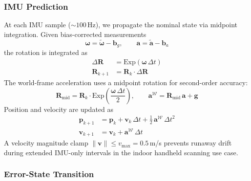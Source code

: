 \subsubsection{IMU Prediction}
\label{sec:imu_predict}

At each IMU sample (${\sim}100$\,Hz), we propagate the nominal state via midpoint integration.
Given bias-corrected measurements
\begin{equation}
    \boldsymbol{\omega} = \tilde{\boldsymbol{\omega}} - \mathbf{b}_g, \qquad
    \mathbf{a} = \tilde{\mathbf{a}} - \mathbf{b}_a
    \label{eq:bias_correct}
\end{equation}
the rotation is integrated as
\begin{align}
    \Delta\mathbf{R} &= \mathrm{Exp}(\boldsymbol{\omega}\,\Delta t) \label{eq:rot_int} \\
    \mathbf{R}_{k+1} &= \mathbf{R}_k \cdot \Delta\mathbf{R} \label{eq:rot_update}
\end{align}
The world-frame acceleration uses a midpoint rotation for second-order accuracy:
\begin{equation}
    \mathbf{R}_\text{mid} = \mathbf{R}_k \cdot \mathrm{Exp}\!\left(\frac{\boldsymbol{\omega}\,\Delta t}{2}\right), \qquad
    \mathbf{a}^{\mathcal{W}} = \mathbf{R}_\text{mid}\,\mathbf{a} + \mathbf{g}
    \label{eq:midpoint}
\end{equation}
Position and velocity are updated as
\begin{align}
    \mathbf{p}_{k+1} &= \mathbf{p}_k + \mathbf{v}_k\,\Delta t + \tfrac{1}{2}\,\mathbf{a}^{\mathcal{W}}\,\Delta t^2 \label{eq:pos_update} \\
    \mathbf{v}_{k+1} &= \mathbf{v}_k + \mathbf{a}^{\mathcal{W}}\,\Delta t \label{eq:vel_update}
\end{align}
A velocity magnitude clamp $\|\mathbf{v}\| \leq v_\text{max} = 0.5$\,m/s prevents runaway drift during extended IMU-only intervals in the indoor handheld scanning use case.

\subsubsection{Error-State Transition}
\label{sec:error_transition}

